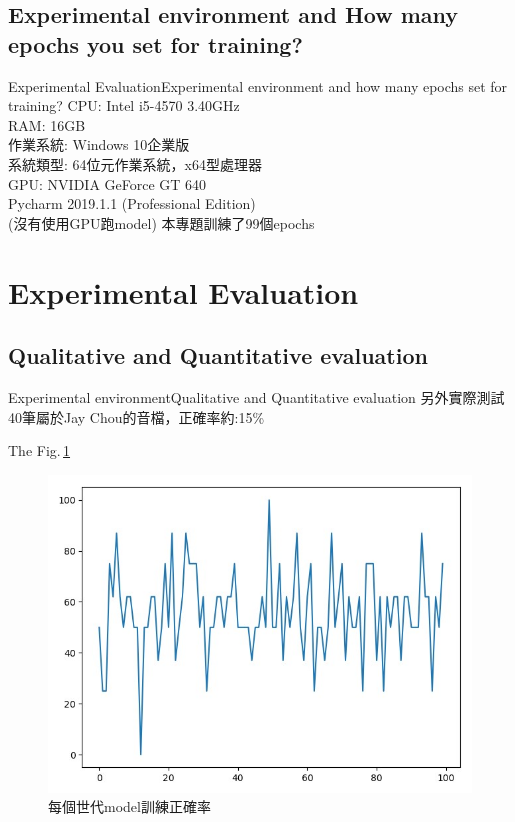 \documentclass{beamer}
\begin{document}
\begin{CJK}{UTF8}{nkai}
\subsection{Experimental environment and How many epochs you set for training? }
\begin{frame}{Experimental Evaluation}{Experimental environment and how many epochs set for training?}
	CPU: Intel i5-4570 3.40GHz\\
	RAM: 16GB\\
	作業系統: Windows 10企業版\\
	系統類型: 64位元作業系統，x64型處理器\\
	GPU: NVIDIA GeForce GT 640\\
	Pycharm 2019.1.1 (Professional Edition)\\
	(沒有使用GPU跑model)\newline\newline
	本專題訓練了99個epochs
\end{frame}

\section{Experimental Evaluation}
\subsection{Qualitative and Quantitative evaluation}


\end{CJK}
\end{document}
